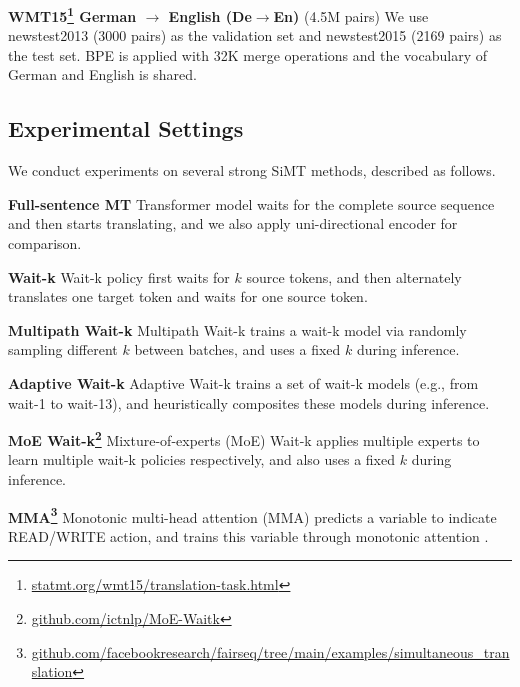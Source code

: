 \documentclass{article} %
\begin{document}
\vspace{-2mm}

\textbf{WMT15\footnote{\url{statmt.org/wmt15/translation-task.html}} German $\!\rightarrow\! $ English (De$\rightarrow$En)} (4.5M pairs) We use newstest2013 (3000 pairs) as the validation set and newstest2015 (2169 pairs) as the test set. BPE \citep{sennrich-etal-2016-neural} is applied with 32K merge operations and the vocabulary of German and English is shared.

\subsection{Experimental Settings}
We conduct experiments on several strong SiMT methods, described as follows.

{\bf Full-sentence MT} \citep{NIPS2017_7181} Transformer model waits for the complete source sequence and then starts translating, and we also apply uni-directional encoder for comparison.

\vspace{-2mm}

{\bf Wait-k} \citep{ma-etal-2019-stacl} Wait-k policy first waits for $k$ source tokens, and then alternately translates one target token and waits for one source token.

\vspace{-2mm}

{\bf Multipath Wait-k} \citep{multipath} Multipath Wait-k trains a wait-k model via randomly sampling different $k$ between batches, and uses a fixed $k$ during inference.

\vspace{-2mm}

{\bf Adaptive Wait-k} \citep{zheng-etal-2020-simultaneous} Adaptive Wait-k trains a set of wait-k models (e.g., from wait-1 to wait-13), and heuristically composites these models during inference.

\vspace{-2mm}

{\bf MoE Wait-k\footnote{\url{github.com/ictnlp/MoE-Waitk}}} \citep{zhang-feng-2021-universal} Mixture-of-experts (MoE) Wait-k applies multiple experts to learn multiple wait-k policies respectively, and also uses a fixed $k$ during inference.

\vspace{-2mm}

{\bf MMA\footnote{\url{github.com/facebookresearch/fairseq/tree/main/examples/simultaneous_translation}}} \citep{Ma2019a} Monotonic multi-head attention (MMA) predicts a variable to indicate READ/WRITE action, and trains this variable through monotonic attention \citep{LinearTime}.
\end{document}
